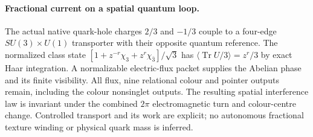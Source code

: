 \paragraph{Fractional current on a spatial quantum loop.}
The actual native quark-hole charges $2/3$ and $-1/3$ couple to a four-edge
$SU(3)\times U(1)$ transporter with their opposite quantum reference.
The normalized class state
$[1+z^{-r}\chi_3+z^r\chi_{\bar3}]/\sqrt3$
has $\langle\operatorname{Tr}U/3\rangle=z^r/3$ by exact Haar integration.
A normalizable electric-flux packet supplies the Abelian phase and its
finite visibility. All flux, nine relational colour and pointer outputs
remain, including the colour nonsinglet outputs. The resulting spatial
interference law is invariant under the combined $2\pi$ electromagnetic
turn and colour-centre change. Controlled transport and its work are
explicit; no autonomous fractional texture winding or physical quark mass
is inferred.
